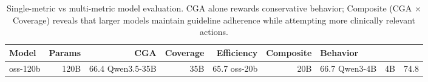 \begin{table}[t]
\centering
\caption{Single-metric vs multi-metric model evaluation. CGA alone rewards conservative behavior;
Composite (CGA $\times$ Coverage) reveals that larger models maintain guideline adherence
while attempting more clinically relevant actions.}
\label{tab:composite}
\begin{tabular}{lrrrrrl}
\toprule
Model & Params & CGA & Coverage & Efficiency & Composite & Behavior \\
\midrule
oss-120b & 120B & 66.4%
Qwen3.5-35B & 35B & 65.7%
oss-20b & 20B & 66.7%
Qwen3-4B & 4B & 74.8%
\bottomrule
\end{tabular}
\end{table}